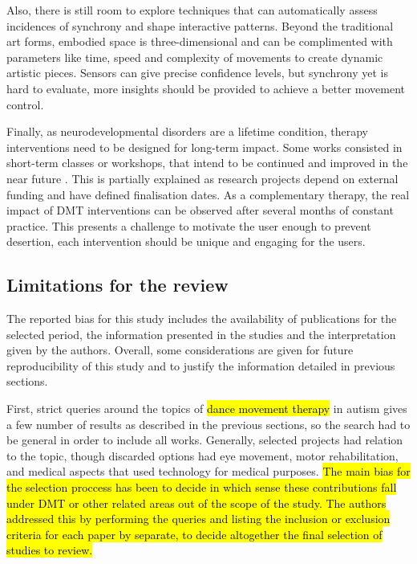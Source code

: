 \documentclass[a4paper,fleqn]{cas-sc}
\begin{document}
Also, there is still room to explore techniques that can automatically assess incidences of synchrony and shape interactive patterns. Beyond the traditional art forms, embodied space is three-dimensional and can be complimented with parameters like time, speed and complexity of movements to create dynamic artistic pieces. Sensors can give precise confidence levels, but synchrony yet is hard to evaluate, more insights should be provided to achieve a better movement control.

Finally, as neurodevelopmental disorders are a lifetime condition, therapy interventions need to be designed for long-term impact. Some works consisted in short-term classes or workshops, that intend to be continued and improved in the near future \cite{Caro18, Krichmar2018, Vargas20, Ragone22}. This is partially explained as research projects depend on external funding and have defined finalisation dates. As a complementary therapy, the real impact of DMT interventions can be observed after several months of constant practice. This presents a challenge to motivate the user enough to prevent desertion, each intervention should be unique and engaging for the users.



\subsection{Limitations for the review}
The reported bias for this study includes the availability of publications for the selected period, the information presented in the studies and the interpretation given by the authors. Overall, some considerations are given for future reproducibility of this study and to justify the information detailed in previous sections.

First, strict queries around the topics of \hl{dance movement therapy} in autism gives a few number of results as described in the previous sections, so the search had to be general in order to include all works. Generally, selected projects had relation to the topic, though discarded options had eye movement, motor rehabilitation, and medical aspects that used technology for medical purposes. \hl{The main bias for the selection proccess has been to decide in which sense these contributions fall under DMT or other related areas out of the scope of the study. The authors addressed this by performing the queries and listing the inclusion or exclusion criteria for each paper by separate, to decide altogether the final selection of studies to review.}
\end{document}
